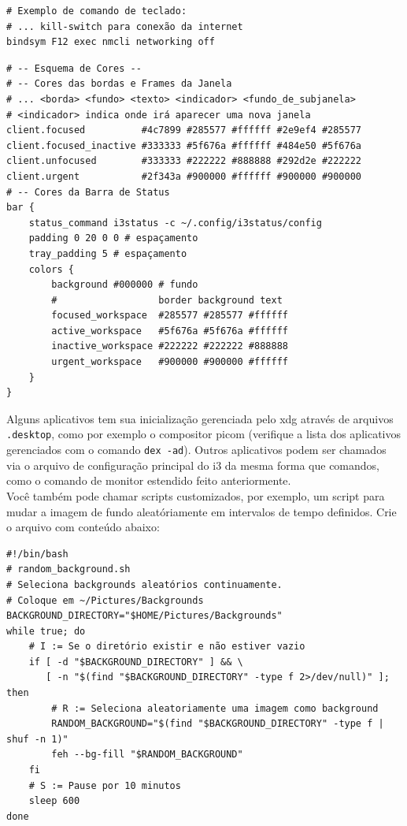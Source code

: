 \documentclass[12pt,a4paper]{article}
\begin{document}
\begin{lstlisting}
# Exemplo de comando de teclado:
# ... kill-switch para conexão da internet
bindsym F12 exec nmcli networking off
\end{lstlisting}

\begin{lstlisting}
# -- Esquema de Cores --
# -- Cores das bordas e Frames da Janela
# ... <borda> <fundo> <texto> <indicador> <fundo_de_subjanela>
# <indicador> indica onde irá aparecer uma nova janela
client.focused          #4c7899 #285577 #ffffff #2e9ef4 #285577
client.focused_inactive #333333 #5f676a #ffffff #484e50 #5f676a
client.unfocused        #333333 #222222 #888888 #292d2e #222222
client.urgent           #2f343a #900000 #ffffff #900000 #900000
# -- Cores da Barra de Status
bar {
    status_command i3status -c ~/.config/i3status/config
    padding 0 20 0 0 # espaçamento
    tray_padding 5 # espaçamento
    colors {
        background #000000 # fundo 
        #                  border background text
        focused_workspace  #285577 #285577 #ffffff
        active_workspace   #5f676a #5f676a #ffffff
        inactive_workspace #222222 #222222 #888888
        urgent_workspace   #900000 #900000 #ffffff
    }
}
\end{lstlisting}

\vspace{\baselineskip}

Alguns aplicativos tem sua inicialização gerenciada pelo xdg através de arquivos \texttt{.desktop}, como por exemplo o compositor picom (verifique a lista dos aplicativos gerenciados com o comando \texttt{dex -ad}). Outros aplicativos podem ser chamados via o arquivo de configuração principal do i3 da mesma forma que comandos, como o comando de monitor estendido feito anteriormente. \\

Você também pode chamar scripts customizados, por exemplo, um script para mudar a imagem de fundo aleatóriamente em intervalos de tempo definidos. Crie o arquivo com conteúdo abaixo: \\

\begin{lstlisting}
#!/bin/bash
# random_background.sh
# Seleciona backgrounds aleatórios continuamente.
# Coloque em ~/Pictures/Backgrounds
BACKGROUND_DIRECTORY="$HOME/Pictures/Backgrounds"
while true; do
    # I := Se o diretório existir e não estiver vazio
    if [ -d "$BACKGROUND_DIRECTORY" ] && \
       [ -n "$(find "$BACKGROUND_DIRECTORY" -type f 2>/dev/null)" ]; then
        # R := Seleciona aleatoriamente uma imagem como background
        RANDOM_BACKGROUND="$(find "$BACKGROUND_DIRECTORY" -type f | shuf -n 1)"
        feh --bg-fill "$RANDOM_BACKGROUND"
    fi
    # S := Pause por 10 minutos
    sleep 600
done
\end{lstlisting}
\end{document}

